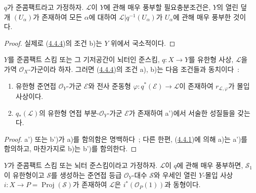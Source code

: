\begin{corollary}[4.4.5]
\label{II.4.4.5-ko}
$q$가 준콤팩트라고 가정하자. $\mathcal{L}$이 $Y$에 관해 매우 풍부할
필요충분조건은, $Y$의 열린 덮개 $(U_\alpha)$가 존재하여 모든
$\alpha$에 대하여 $\mathcal{L}|q^{-1}(U_\alpha)$가 $U_\alpha$에 관해
매우 풍부한 것이다.
\end{corollary}

\begin{proof}
실제로 (\hyperref[II.4.4.4-ko]{4.4.4})의 조건 b)는 $Y$ 위에서
국소적이다.
\end{proof}

\begin{proposition}[4.4.6]
\label{II.4.4.6-ko}
$Y$를 준콤팩트 스킴 또는 그 기저공간이 뇌터인 준스킴,
$q:X\to Y$를 유한형 사상, $\mathcal{L}$을 가역
$\mathcal{O}_X$-가군이라 하자. 그러면
(\hyperref[II.4.4.4-ko]{4.4.4})의 조건 a), b)는 다음 조건들과
동치이다~:
\begin{enumerate}
  \item[\rm{a')}] 유한형 준연접 $\mathcal{O}_Y$-가군 $\mathcal{E}$와
  전사 준동형 $\varphi:q^*(\mathcal{E})\to\mathcal{L}$이 존재하여
  $r_{\mathcal{L},\varphi}$가 몰입 사상이다.
  \item[\rm{b')}] $q_*(\mathcal{L})$의 유한형 연접
  부분-$\mathcal{O}_Y$-가군 $\mathcal{E}$가 존재하여 a')에서 서술한
  성질들을 갖는다.
\end{enumerate}
\end{proposition}

\begin{proof}
a') 또는 b')가 a)를 함의함은 명백하다~; 다른 한편,
(\hyperref[II.4.4.1-ko]{4.4.1})에 의해 a)는 a')를 함의하고, 마찬가지로
b)는 b')를 함의한다.
\end{proof}

\begin{corollary}[4.4.7]
\label{II.4.4.7-ko}
$Y$가 준콤팩트 스킴 또는 뇌터 준스킴이라고 가정하자.
$\mathcal{L}$이 $q$에 관해 매우 풍부하면, $\mathcal{S}_1$이 유한형이고
$\mathcal{S}$를 생성하는 준연접 등급 $\mathcal{O}_Y$-대수
$\mathcal{S}$와 우세인 열린 $Y$-몰입 사상
$i:X\to P=\operatorname{Proj}(\mathcal{S})$가 존재하여
$\mathcal{L}$은 $i^*(\mathcal{O}_P(1))$과 동형이다.
\end{corollary}

